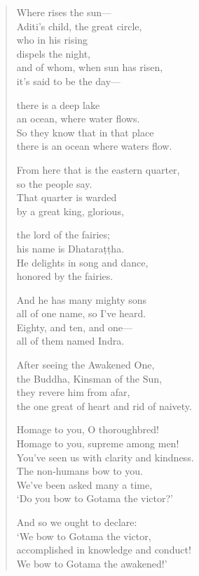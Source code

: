 \documentclass[12pt,openany]{book}%
\begin{document}
\begin{verse}
Where rises the sun—\\
Aditi’s child, the great circle, \\
who in his rising \\
dispels the night, \\
and of whom, when sun has risen, \\
it’s said to be the day—

there is a deep lake \\
an ocean, where water flows. \\
So they know that in that place \\
there is an ocean where waters flow. 

From here that is the eastern quarter, \\
so the people say. \\
That quarter is warded \\
by a great king, glorious, 

the lord of the fairies; \\
his name is \textsanskrit{Dhataraṭṭha}. \\
He delights in song and dance, \\
honored by the fairies. 

And he has many mighty sons \\
all of one name, so I’ve heard. \\
Eighty, and ten, and one—\\
all of them named Indra. 

After seeing the Awakened One, \\
the Buddha, Kinsman of the Sun, \\
they revere him from afar, \\
the one great of heart and rid of naivety. 

Homage to you, O thoroughbred! \\
Homage to you, supreme among men! \\
You’ve seen us with clarity and kindness. \\
The non-humans bow to you. \\
We’ve been asked many a time, \\
‘Do you bow to Gotama the victor?’ 

And so we ought to declare: \\
‘We bow to Gotama the victor, \\
accomplished in knowledge and conduct! \\
We bow to Gotama the awakened!’ 


\end{verse}
\end{document}
